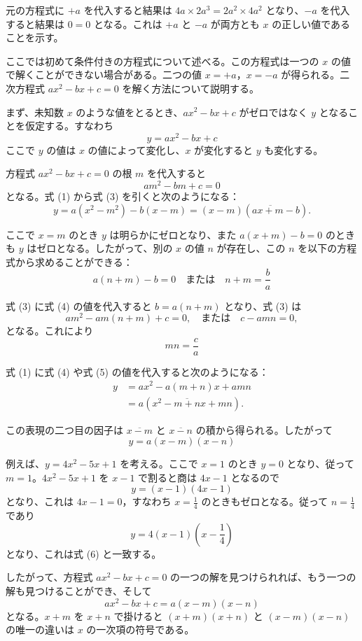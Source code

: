 \documentclass[a4paper,11pt,openany]{ltjsbook}
\begin{document}
元の方程式に \(+a\) を代入すると結果は \(4a \times 2a^3 = 2a^2 \times 4a^2\) となり、\(-a\) を代入すると結果は \(0 = 0\) となる。これは \(+a\) と \(-a\) が両方とも \(x\) の正しい値であることを示す。

ここでは初めて条件付きの方程式について述べる。この方程式は一つの \(x\) の値で解くことができない場合がある。二つの値 \(x = +a\)，\(x = -a\) が得られる。二次方程式 \(ax^2 - bx + c = 0\) を解く方法について説明する。

まず、未知数 \(x\) のような値をとるとき、\(ax^2 - bx + c\) がゼロではなく \(y\) となることを仮定する。すなわち
\[
y = ax^2 - bx + c \tag{1}
\]
ここで \(y\) の値は \(x\) の値によって変化し、\(x\) が変化すると \(y\) も変化する。

方程式 \(ax^2 - bx + c = 0\) の根 \(m\) を代入すると
\[
am^2 - bm + c = 0 \tag{3}
\]
となる。式 (1) から式 (3) を引くと次のようになる：
\[
y = a(x^2 - m^2) - b(x - m) = (x - m)(a\overline{x + m} - b).
\]

ここで \(x = m\) のとき \(y\) は明らかにゼロとなり、また \(a(x + m) - b = 0\) のときも \(y\) はゼロとなる。したがって、別の \(x\) の値 \(n\) が存在し、この \(n\) を以下の方程式から求めることができる：
\[
a(n + m) - b = 0 \quad \text{または} \quad n + m = \frac{b}{a} \tag{4}
\]

式 (3) に式 (4) の値を代入すると \(b = a(n + m)\) となり、式 (3) は
\[
am^2 - am(n + m) + c = 0, \quad \text{または} \quad c - amn = 0,
\]
となる。これにより
\[
mn = \frac{c}{a} \tag{5}
\]

式 (1) に式 (4) や式 (5) の値を代入すると次のようになる：
\begin{align*}
y &= ax^2 - a(m + n)x + amn \\
  &= a(x^2 - \overline{m + n}x + mn).
\end{align*}

この表現の二つ目の因子は \(\overline{x - m}\) と \(\overline{x - n}\) の積から得られる。したがって
\[
y = a(x - m)(x - n) \tag{6}
\]

例えば、\(y = 4x^2 - 5x + 1\) を考える。ここで \(x = 1\) のとき \(y = 0\) となり、従って \(m = 1\)。\(4x^2 - 5x + 1\) を \(x - 1\) で割ると商は \(4x - 1\) となるので
\[
y = (x - 1)(4x - 1)
\]
となり、これは \(4x - 1 = 0\)，すなわち \(x = \frac{1}{4}\) のときもゼロとなる。従って \(n = \frac{1}{4}\) であり
\[
y = 4(x - 1)(x - \frac{1}{4})
\]
となり、これは式 (6) と一致する。

したがって、方程式 \(ax^2 - bx + c = 0\) の一つの解を見つけられれば、もう一つの解も見つけることができ、そして
\[
ax^2 - bx + c = a(x - m)(x - n)
\]
となる。\(x + m\) を \(x + n\) で掛けると \((x + m)(x + n)\) と \((x - m)(x - n)\) の唯一の違いは \(x\) の一次項の符号である。
\end{document}
